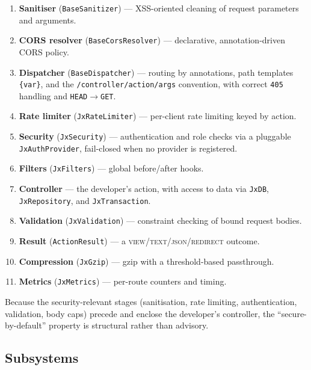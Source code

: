 

\begin{enumerate}
  \item \textbf{Sanitiser} (\texttt{BaseSanitizer}) --- XSS-oriented
    cleaning of request parameters and arguments.
  \item \textbf{CORS resolver} (\texttt{BaseCorsResolver}) ---
    declarative, annotation-driven CORS policy.
  \item \textbf{Dispatcher} (\texttt{BaseDispatcher}) --- routing by
    annotations, path templates \texttt{\{var\}}, and the
    \texttt{/controller/action/args} convention, with correct
    \texttt{405} handling and \texttt{HEAD}$\rightarrow$\texttt{GET}.
  \item \textbf{Rate limiter} (\texttt{JxRateLimiter}) --- per-client
    rate limiting keyed by action.
  \item \textbf{Security} (\texttt{JxSecurity}) --- authentication and
    role checks via a pluggable \texttt{JxAuthProvider}, fail-closed
    when no provider is registered.
  \item \textbf{Filters} (\texttt{JxFilters}) --- global
    before/after hooks.
  \item \textbf{Controller} --- the developer's action, with access to
    data via \texttt{JxDB}, \texttt{JxRepository}, and
    \texttt{JxTransaction}.
  \item \textbf{Validation} (\texttt{JxValidation}) --- constraint
    checking of bound request bodies.
  \item \textbf{Result} (\texttt{ActionResult}) --- a
    \textsc{view}/\textsc{text}/\textsc{json}/\textsc{redirect}
    outcome.
  \item \textbf{Compression} (\texttt{JxGzip}) --- gzip with a
    threshold-based passthrough.
  \item \textbf{Metrics} (\texttt{JxMetrics}) --- per-route counters
    and timing.
\end{enumerate}

Because the security-relevant stages (sanitisation, rate limiting,
authentication, validation, body caps) precede and enclose the
developer's controller, the ``secure-by-default'' property is
structural rather than advisory.

\subsection{Subsystems}




